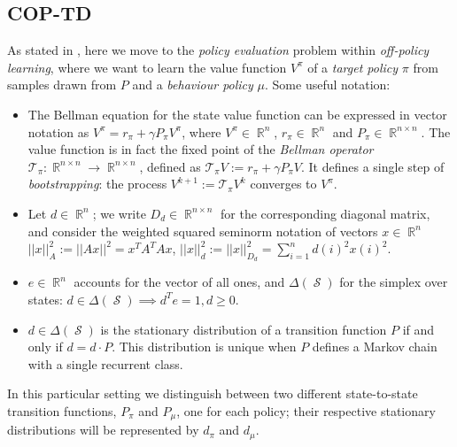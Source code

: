 \documentclass[12pt,a4paper,openright,twoside]{article}
\DeclareMathOperator*{\R}{\mathbb{R}}
\DeclareMathOperator*{\Sspace}{\mathcal{S}}
\numberwithin{equation}{section}
\theoremstyle{definition}
\theoremstyle{remark}
\theoremstyle{plain}
\begin{document}
\subsection{COP-TD}

As stated in \cite{DCOPTD}, here we move to the \textit{policy evaluation} problem within \textit{off-policy learning}, where we want to learn the value function $V^\pi$ of a \textit{target policy} $\pi$ from samples drawn from $P$ and a \textit{behaviour policy} $\mu$. Some useful notation:
\begin{itemize}
    \item The Bellman equation for the state value function can be expressed in vector notation as $V^\pi = r_\pi + \gamma P_\pi V^\pi$, where $V^\pi \in \R^{n}$, $r_\pi \in \R^n$ and $P_\pi \in \R^{n \times n}$. The value function is in fact the fixed point of the \textit{Bellman operator} $\mathcal{T}_\pi: \R^{n \times n} \rightarrow \R^{n \times n}$, defined as $\mathcal{T}_\pi V := r_\pi + \gamma P_\pi V $. It defines a single step of \textit{bootstrapping}: the process $V^{k+1} := \mathcal{T}_\pi V^k$ converges to $V^\pi$.
    \item Let $d \in \R^n$; we write $D_d \in \R^{n\times n}$ for the corresponding diagonal matrix, and consider the weighted squared seminorm notation of vectors $x\in\R^n$ $||x||^2_{A} := ||A x||^2 = x^T A^T A x$, $||x||^2_d :=||x||^2_{D_d}= \sum_{i=1}^n d(i)^2 x(i)^2$.
    \item $e\in\R^n$ accounts for the vector of all ones, and $\Delta(\Sspace)$ for the simplex over states: $d \in \Delta(\Sspace) \implies d^T e = 1, d \geq 0$.
    \item $d \in \Delta(\Sspace)$ is the stationary distribution of a transition function $P$ if and only if $d=d \cdot P$. This distribution is unique when $P$ defines a Markov chain with a single recurrent class\cite{unichain}.
\end{itemize}
In this particular setting we distinguish between two different state-to-state transition functions, $P_\pi$ and $P_\mu$, one for each policy; their respective stationary distributions will be represented by $d_\pi$ and $d_\mu$. 
\end{document}
